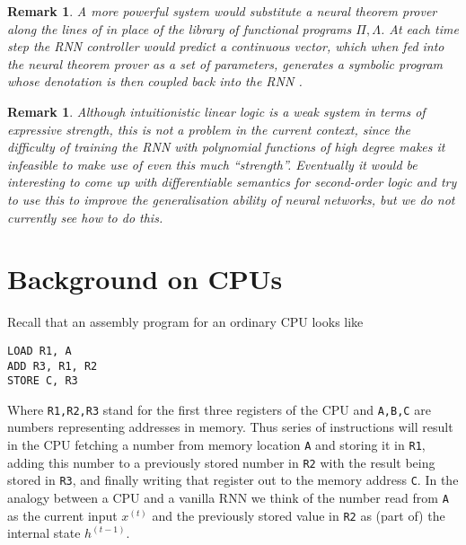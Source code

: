 \documentclass[english,letter paper,12pt,leqno]{article}
\theoremstyle{example}
\newtheorem{remark}[theorem]{Remark}
\numberwithin{equation}{section}
\DeclareMathOperator{\End}{End}
\begin{document}

\begin{remark} A more powerful system would substitute a neural theorem prover along the lines of \cite{alemi,ntp} in place of the library of functional programs $\Pi, \Lambda$. At each time step the RNN controller would predict a continuous vector, which when fed into the neural theorem prover as a set of parameters, generates a symbolic program whose denotation is then coupled back into the RNN \cite{tarlow}.
\end{remark}

\begin{remark} Although intuitionistic linear logic is a weak system in terms of expressive strength, this is not a problem in the current context, since the difficulty of training the RNN with polynomial functions of high degree makes it infeasible to make use of even this much ``strength''. Eventually it would be interesting to come up with differentiable semantics for second-order logic and try to use this to improve the generalisation ability of neural networks, but we do not currently see how to do this.
\end{remark}

\newpage

\appendix

\section{Background on CPUs}\label{section:appendix_cpu}

Recall that an assembly program for an ordinary CPU looks like
\begin{verbatim}
LOAD R1, A
ADD R3, R1, R2
STORE C, R3
\end{verbatim}
Where \verb+R1,R2,R3+ stand for the first three registers of the CPU and \verb+A,B,C+ are numbers representing addresses in memory. Thus series of instructions will result in the CPU fetching a number from memory location \verb+A+ and storing it in \verb+R1+, adding this number to a previously stored number in \verb+R2+ with the result being stored in \verb+R3+, and finally writing that register out to the memory address \verb+C+. In the analogy between a CPU and a vanilla RNN we think of the number read from \verb+A+ as the current input $x^{(t)}$ and the previously stored value in \verb+R2+ as (part of) the internal state $h^{(t-1)}$.
\end{document}
